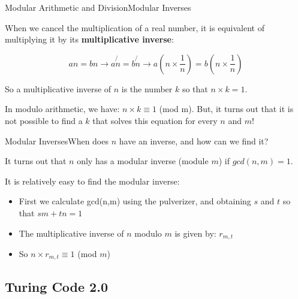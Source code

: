 \begin{frame}{Modular Arithmetic and Division}{Modular Inverses}

  When we cancel the multiplication of a real number, it is equivalent of multiplying it by its {\bf multiplicative inverse}:

  \begin{equation*}
    an = bn \to a\not{n} = b\not{n} \to a(n\times \frac{1}{n}) = b(n\times \frac{1}{n})
  \end{equation*}

  So a multiplicative inverse of $n$ is the number $k$ so that $n\times k =1$.\bigskip

  In modulo arithmetic, we have: $n\times k \equiv 1$ (mod m). But, it turns out that it is not possible to find a $k$ that solves this equation for every $n$ and $m$!
\end{frame}


\begin{frame}{Modular Inverses}{When does $n$ have an inverse, and how can we find it?}

  It turns out that $n$ only has a modular inverse (module $m$) if $gcd(n,m) = 1$.\bigskip

  It is relatively easy to find the modular inverse:
  \begin{itemize}
    \item First we calculate gcd(n,m) using the pulverizer, and obtaining $s$ and $t$ so that $sm+tn=1$
    \item The multiplicative inverse of $n$ modulo $m$ is given by: $r_{m,t}$
    \item So $n\times r_{m,t} \equiv 1$ (mod $m$)
  \end{itemize}
\end{frame}

\subsection{Turing Code 2.0}

